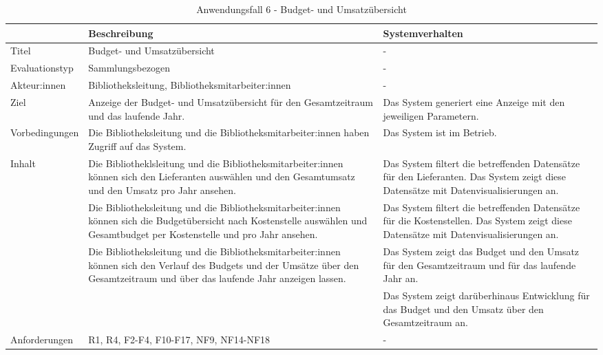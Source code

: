 \begingroup
\setlength{\tabcolsep}{10pt} %
\renewcommand{\arraystretch}{1.25} 
\begin{table}[h]
    \centering
    \begin{adjustbox}{max width=\textwidth}
    \begin{tabular}{lp{7.0cm}p{7.0cm}}
       \toprule
       \textbf{}          & \textbf{Beschreibung} &\textbf{Systemverhalten}\\
       \midrule
        Titel                            &Budget- und Umsatzübersicht& -\\
        Evaluationstyp                   &Sammlungsbezogen                   & -\\
        Akteur:innen                     &Bibliotheksleitung, Bibliotheksmitarbeiter:innen& -\\
        Ziel                             &Anzeige der Budget- und Umsatzübersicht für den Gesamtzeitraum und das laufende Jahr.& Das System generiert eine Anzeige mit den jeweiligen Parametern.\\
        Vorbedingungen                   &Die Bibliotheksleitung und die Bibliotheksmitarbeiter:innen haben Zugriff auf das System.& Das System ist im Betrieb.\\
        Inhalt                           &Die Bibliotheklsleitung und die Bibliotheksmitarbeiter:innen können sich den Lieferanten auswählen und den Gesamtumsatz und den Umsatz pro Jahr ansehen.& Das System filtert die betreffenden Datensätze für den Lieferanten. Das System zeigt diese Datensätze mit Datenvisualisierungen an.\\
                                         &Die Bibliotheksleitung und die Bibliotheksmitarbeiter:innen können sich die Budgetübersicht nach Kostenstelle auswählen und Gesamtbudget per Kostenstelle und pro Jahr ansehen. &Das System filtert die betreffenden Datensätze für die Kostenstellen. Das System zeigt diese Datensätze mit Datenvisualisierungen an.\\
                                         &Die Bibliotheksleitung und die Bibliotheksmitarbeiter:innen können sich den Verlauf des Budgets und der Umsätze über den Gesamtzeitraum und über das laufende Jahr anzeigen lassen. &Das System zeigt das Budget und den Umsatz für den Gesamtzeitraum und für das laufende Jahr an.\\
                                         & &Das System zeigt darüberhinaus Entwicklung für das Budget und den Umsatz über den Gesamtzeitraum an.\\

        Anforderungen                   &R1, R4, F2-F4, F10-F17, NF9, NF14-NF18& -\\
        \bottomrule
    \end{tabular}
    \end{adjustbox}
    \caption{%
    Anwendungsfall 6 - Budget- und Umsatzübersicht   }
    \label{tab:AF_BudgetUmsatz}
    \end{table}
\endgroup


